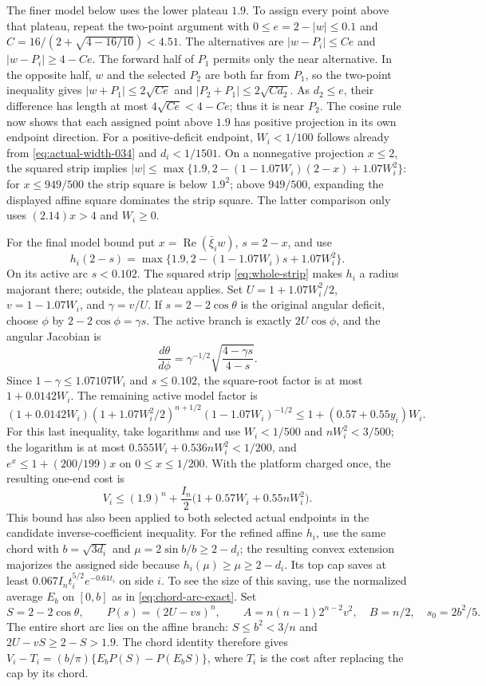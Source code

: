 \documentclass[11pt]{article}
\begin{document}
	The finer model below uses the lower plateau $1.9$.  To assign every
	point above that plateau, repeat the two-point argument with
	$0\leq e=2-|w|\leq0.1$ and
	$C=16/(2+\sqrt{4-16/10})<4.51$.
	The alternatives are $|w-P_i|\leq Ce$ and
	$|w-P_i|\geq4-Ce$.  The forward half of $P_1$ permits only the
	near alternative.  In the opposite half, $w$ and the selected $P_2$
	are both far from $P_1$, so the two-point inequality gives
	$|w+P_1|\leq2\sqrt{Ce}$ and
	$|P_2+P_1|\leq2\sqrt{Cd_2}$.
	As $d_2\leq e$, their difference has length at most
	$4\sqrt{Ce}<4-Ce$; thus it is near $P_2$.
	The cosine rule now shows that each assigned point above $1.9$
	has positive projection in its own endpoint direction.
	For a positive-deficit endpoint, $W_i<1/100$ follows already from
	\eqref{eq:actual-width-034} and $d_i<1/1501$.
	On a nonnegative projection $x\leq2$, the squared strip implies
	$|w|\leq\max\{1.9,2-(1-1.07W_i)(2-x)+1.07W_i^2\}$:
	for $x\leq949/500$ the strip square is below $1.9^2$;
	above $949/500$, expanding the displayed affine square dominates
	the strip square.  The latter comparison only uses
	$(2.14)x>4$ and $W_i\geq0$.
	
	For the final model bound put $x=\operatorname{Re}(\bar\xi_iw)$,
	$s=2-x$, and use
	\[
	h_i(2-s)=\max\{1.9,
	2-(1-1.07W_i)s+1.07W_i^2\}.
	\]
	On its active arc $s<0.102$.  The squared strip
	\eqref{eq:whole-strip} makes $h_i$ a radius majorant there;
	outside, the plateau applies.  Set
	$U=1+1.07W_i^2/2$, $v=1-1.07W_i$, and $\gamma=v/U$.
	If $s=2-2\cos\theta$ is the original angular deficit, choose
	$\phi$ by $2-2\cos\phi=\gamma s$.  The active branch is exactly
	$2U\cos\phi$, and the angular Jacobian is
	\[
	\frac{d\theta}{d\phi}
	=\gamma^{-1/2}
	\sqrt{\frac{4-\gamma s}{4-s}}.
	\]
	Since $1-\gamma\leq1.07107W_i$ and $s\leq0.102$, the square-root
	factor is at most $1+0.0142W_i$.  The remaining active model factor is
	\[
	(1+0.0142W_i)(1+1.07W_i^2/2)^{n+1/2}
	(1-1.07W_i)^{-1/2}
	\leq1+(0.57+0.55y_i)W_i.
	\]
	For this last inequality, take logarithms and use
	$W_i<1/500$ and $nW_i^2<3/500$; the logarithm is at most
	$0.555W_i+0.536nW_i^2<1/200$, and
	$e^x\leq1+(200/199)x$ on $0\leq x\leq1/200$.
	With the platform charged once, the resulting one-end cost is
	\[
	V_i\leq(1.9)^n+\frac{I_n}{2}
	\bigl(1+0.57W_i+0.55nW_i^2\bigr).
	\]
	This bound has also been applied to both selected actual endpoints
	in the candidate inverse-coefficient inequality.
	For the refined affine $h_i$, use the same chord with
	$b=\sqrt{3d_i}$ and $\mu=2\sin b/b\geq2-d_i$;
	the resulting convex extension majorizes the assigned side because
	$h_i(\mu)\geq\mu\geq2-d_i$.  Its top cap saves at least
	$0.067I_nt_i^{5/2}e^{-0.61t_i}$ on side $i$.
	To see the size of this saving, use the normalized average
	$E_b$ on $[0,b]$ as in \eqref{eq:chord-arc-exact}. Set
	\[
	S=2-2\cos\theta,\qquad P(s)=(2U-vs)^n,\qquad
	A=n(n-1)2^{n-2}v^2,\quad B=n/2,\quad s_0=2b^2/5 .
	\]
	The entire short arc lies on the affine branch: $S\leq b^2<3/n$
	and $2U-vS\geq2-S>1.9$. The chord identity therefore gives
	$V_i-T_i=(b/\pi)\{E_bP(S)-P(E_bS)\}$, where $T_i$ is the
	cost after replacing the cap by its chord.
	
\end{document}
